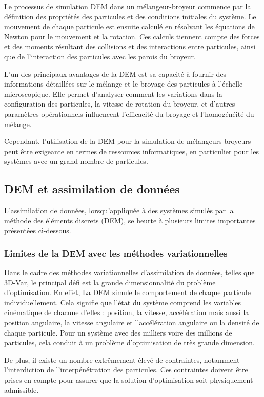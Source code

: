 Le processus de simulation DEM dans un mélangeur-broyeur commence par la définition des propriétés des particules et des conditions initiales du système. Le mouvement de chaque particule est ensuite calculé en résolvant les équations de Newton pour le mouvement et la rotation. Ces calculs tiennent compte des forces et des moments résultant des collisions et des interactions entre particules, ainsi que de l'interaction des particules avec les parois du broyeur.

L'un des principaux avantages de la DEM est sa capacité à fournir des informations détaillées sur le mélange et le broyage des particules à l'échelle microscopique. Elle permet d'analyser comment les variations dans la configuration des particules, la vitesse de rotation du broyeur, et d'autres paramètres opérationnels influencent l'efficacité du broyage et l'homogénéité du mélange.

Cependant, l'utilisation de la DEM pour la simulation de mélangeurs-broyeurs peut être exigeante en termes de ressources informatiques, en particulier pour les systèmes avec un grand nombre de particules.


\subsection{DEM et assimilation de données}

L'assimilation de données, lorsqu'appliquée à des systèmes simulés par la méthode des éléments discrets (DEM), se heurte à plusieurs limites importantes présentées ci-dessous.

\subsubsection{Limites de la DEM avec les méthodes variationnelles}

Dans le cadre des méthodes variationnelles d'assimilation de données, telles que 3D-Var, le principal défi est la grande dimensionnalité du problème d'optimisation.
En effet, La DEM simule le comportement de chaque particule individuellement. Cela signifie que l'état du système comprend les variables cinématique de chacune d'elles : position, la vitesse, accélération mais aussi la position angulaire, la vitesse angulaire et l'accélération angulaire ou la densité de chaque particule. Pour un système avec des milliers voire des millions de particules, cela conduit à un problème d'optimisation de très grande dimension.

De plus, il existe un nombre extrêmement élevé de contraintes, notamment l'interdiction de l'interpénétration des particules. Ces contraintes doivent être prises en compte pour assurer que la solution d'optimisation soit physiquement admissible.


